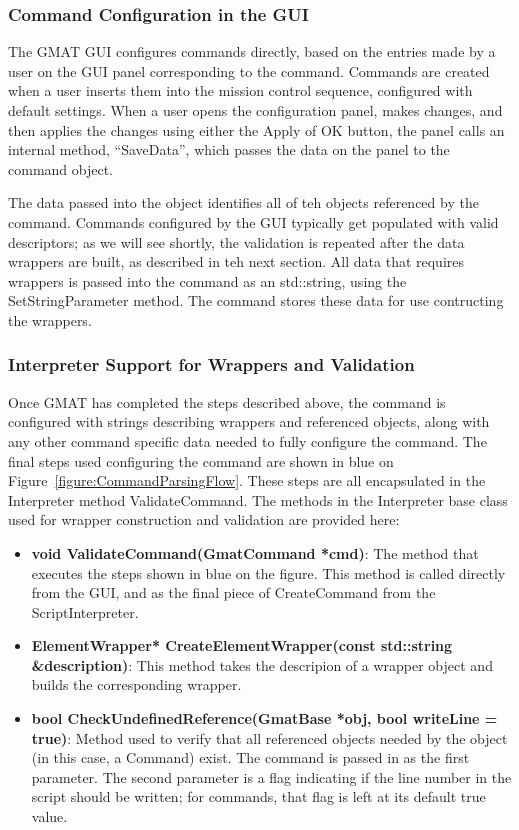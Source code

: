 \subsubsection{Command Configuration in the GUI}

The GMAT GUI configures commands directly, based on the entries made by a user on the GUI panel
corresponding to the command.  Commands are created when a user inserts them into the mission
control sequence, configured with default settings.  When a user opens the configuration panel,
makes changes, and then applies the changes using either the Apply of OK button, the panel calls an
internal method, ``SaveData'', which passes the data on the panel to the command object.

The data passed into the object identifies all of teh objects referenced by the command.  Commands
configured by the GUI typically get populated with valid descriptors; as we will see shortly, the
 validation is repeated after the data wrappers are built, as described in teh next section.  All
data that requires wrappers is passed into the command as an std::string, using the
SetStringParameter method. The command stores these data for use contructing the wrappers.

\subsubsection{Interpreter Support for Wrappers and Validation}

Once GMAT has completed the steps described above, the command is configured with strings
describing wrappers and referenced objects, along with any other command specific data needed to
fully configure the command.  The final steps used configuring the command are shown in blue on
Figure~\ref{figure:CommandParsingFlow}.  These steps are all encapsulated in the Interpreter method
ValidateCommand.  The methods in the Interpreter base class used for wrapper construction and
validation are provided here:

\begin{itemize}
\item \textbf{void ValidateCommand(GmatCommand *cmd)}:  The method that executes the steps shown in
blue on the figure.  This method is called directly from the GUI, and as the final piece of
CreateCommand from the ScriptInterpreter.
\item \textbf{ElementWrapper* CreateElementWrapper(const std::string \&description)}:  This method
takes the descripion of a wrapper object and builds the corresponding wrapper.
\item \textbf{bool CheckUndefinedReference(GmatBase *obj, bool writeLine = true)}:  Method used to
verify that all referenced objects needed by the object (in this case, a Command) exist.  The
command is passed in as the first parameter.  The second parameter is a flag indicating if the line
number in the script should be written; for commands, that flag is left at its default true value.
\end{itemize}


